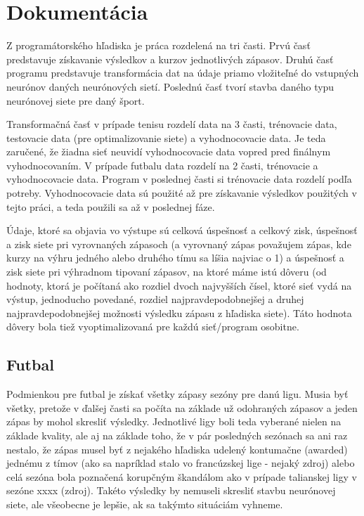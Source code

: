 \chapter{Dokumentácia}

Z programátorského hľadiska je práca rozdelená na tri časti. 
Prvú časť predstavuje získavanie výsledkov a kurzov jednotlivých zápasov. 
Druhú časť programu predstavuje transformácia dat na údaje priamo vložiteľné do vstupných neurónov daných neurónových sietí.
Poslednú časť tvorí stavba daného typu neurónovej siete pre daný šport.

Transformačná časť v prípade tenisu rozdelí data na 3 časti, trénovacie data, testovacie data (pre optimalizovanie siete) a vyhodnocovacie data.
Je teda zaručené, že žiadna sieť neuvidí vyhodnocovacie data vopred pred finálnym vyhodnocovaním.
V prípade futbalu data rozdelí na 2 časti, trénovacie a vyhodnocovacie data.
Program v poslednej časti si trénovacie data rozdelí podľa potreby.
Vyhodnocovacie data sú použité až pre získavanie výsledkov použitých v tejto práci, a teda použili sa až v poslednej fáze.

Údaje, ktoré sa objavia vo výstupe sú celková úspešnosť a celkový zisk, úspešnosť a zisk siete pri vyrovnaných zápasoch (a vyrovnaný zápas považujem zápas, kde kurzy na výhru jedného alebo druhého tímu sa líšia najviac o 1) a úspešnosť a zisk siete pri výhradnom tipovaní zápasov, na ktoré máme istú dôveru (od hodnoty, ktorá je počítaná ako rozdiel dvoch najvyšších čísel, ktoré sieť vydá na výstup, jednoducho povedané, rozdiel najpravdepodobnejšej a druhej najpravdepodobnejšej možnosti výsledku zápasu z hľadiska siete).
Táto hodnota dôvery bola tiež vyoptimalizovaná pre každú sieť/program osobitne.

\section{Futbal}

Podmienkou pre futbal je získať všetky zápasy sezóny pre danú ligu. 
Musia byť všetky, pretože v ďalšej časti sa počíta na základe už odohraných zápasov a jeden zápas by mohol skresliť výsledky. 
Jednotlivé ligy boli teda vyberané nielen na základe kvality, ale aj na základe toho, že v pár posledných sezónach sa ani raz nestalo, že zápas musel byť z nejakého hľadiska udelený kontumačne (awarded) jednému z tímov (ako sa napríklad stalo vo francúzskej lige - nejaký zdroj) alebo celá sezóna bola poznačená korupčným škandálom ako v prípade talianskej ligy v sezóne xxxx (zdroj).
Takéto výsledky by nemuseli skresliť stavbu neurónovej siete, ale všeobecne je lepšie, ak sa takýmto situáciám vyhneme.

